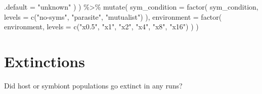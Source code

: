 \documentclass[
]{book}
\newenvironment{Shaded}{\begin{snugshade}}{\end{snugshade}}
\newcommand{\AttributeTok}[1]{\textcolor[rgb]{0.77,0.63,0.00}{#1}}
\newcommand{\FunctionTok}[1]{\textcolor[rgb]{0.00,0.00,0.00}{#1}}
\newcommand{\NormalTok}[1]{#1}
\newcommand{\SpecialCharTok}[1]{\textcolor[rgb]{0.00,0.00,0.00}{#1}}
\newcommand{\StringTok}[1]{\textcolor[rgb]{0.31,0.60,0.02}{#1}}
\begin{document}
\begin{Shaded}
\begin{Highlighting}[]
      \AttributeTok{.default =} \StringTok{"unknown"}
\NormalTok{    )}
\NormalTok{  ) }\SpecialCharTok{\%\textgreater{}\%}
  \FunctionTok{mutate}\NormalTok{(}
    \AttributeTok{sym\_condition =} \FunctionTok{factor}\NormalTok{(}
\NormalTok{      sym\_condition,}
      \AttributeTok{levels =} \FunctionTok{c}\NormalTok{(}\StringTok{"no{-}syms"}\NormalTok{, }\StringTok{"parasite"}\NormalTok{, }\StringTok{"mutualist"}\NormalTok{)}
\NormalTok{    ),}
    \AttributeTok{environment =} \FunctionTok{factor}\NormalTok{(}
\NormalTok{      environment,}
      \AttributeTok{levels =} \FunctionTok{c}\NormalTok{(}\StringTok{"x0.5"}\NormalTok{, }\StringTok{"x1"}\NormalTok{, }\StringTok{"x2"}\NormalTok{, }\StringTok{"x4"}\NormalTok{, }\StringTok{"x8"}\NormalTok{, }\StringTok{"x16"}\NormalTok{)}
\NormalTok{    )}
\NormalTok{  )}
\end{Highlighting}
\end{Shaded}

\hypertarget{extinctions-2}{%
\section{Extinctions}\label{extinctions-2}}

Did host or symbiont populations go extinct in any runs?
\end{document}
